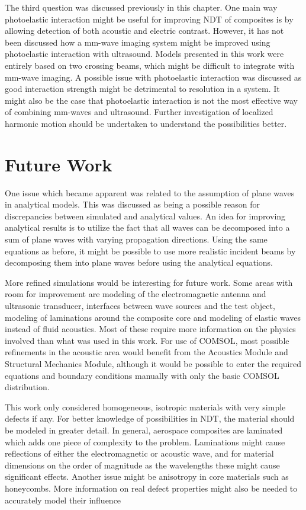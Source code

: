 \documentclass[11pt,twoside]{eitExjobb}
\begin{document}
	The third question was discussed previously in this chapter. One main way photoelastic interaction might be useful for improving NDT of composites is by allowing detection of both acoustic and electric contrast. However, it has not been discussed how a mm-wave imaging system might be improved using photoelastic interaction with ultrasound. Models presented in this work were entirely based on two crossing beams, which might be difficult to integrate with mm-wave imaging. A possible issue with photoelastic interaction was discussed as good interaction strength might be detrimental to resolution in a system. It might also be the case that photoelastic interaction is not the most effective way of combining mm-waves and ultrasound. Further investigation of localized harmonic motion should be undertaken to understand the possibilities better.
	
	\chapter{Future Work} \label{ch:future}
	One issue which became apparent was related to the assumption of plane waves in analytical models. This was discussed as being a possible reason for discrepancies between simulated and analytical values. An idea for improving analytical results is to utilize the fact that all waves can be decomposed into a sum of plane waves with varying propagation directions. Using the same equations as before, it might be possible to use more realistic incident beams by decomposing them into plane waves before using the analytical equations.
	
	More refined simulations would be interesting for future work. Some areas with room for improvement are modeling of the electromagnetic antenna and ultrasonic transducer, interfaces between wave sources and the test object, modeling of laminations around the composite core and modeling of elastic waves instead of fluid acoustics. Most of these require more information on the physics involved than what was used in this work. For use of COMSOL, most possible refinements in the acoustic area would benefit from the Acoustics Module and Structural Mechanics Module, although it would be possible to enter the required equations and boundary conditions manually with only the basic COMSOL distribution.
	
	This work only considered homogeneous, isotropic materials with very simple defects if any. For better knowledge of possibilities in NDT, the material should be modeled in greater detail. In general, aerospace composites are laminated which adds one piece of complexity to the problem. Laminations might cause reflections of either the electromagnetic or acoustic wave, and for material dimensions on the order of magnitude as the wavelengths these might cause significant effects. Another issue might be anisotropy in core materials such as honeycombs. More information on real defect properties might also be needed to accurately model their influence
	
\end{document}
